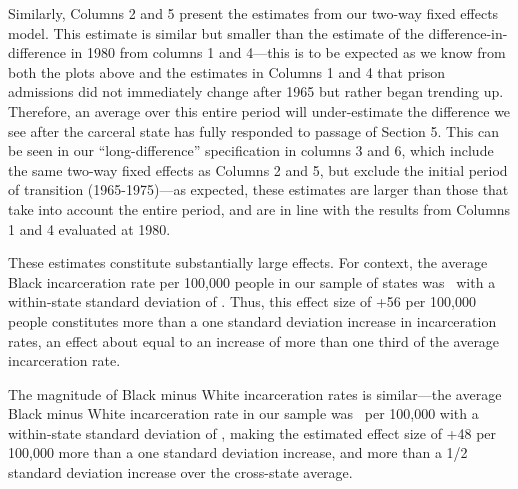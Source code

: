 \documentclass[12pt]{article}
\begin{document}
Similarly, Columns 2 and 5 present the estimates from our two-way fixed effects model. This estimate is similar but smaller than the estimate of the difference-in-difference in 1980 from columns 1 and 4---this is to be expected as we know from both the plots above and the estimates in Columns 1 and 4 that prison admissions did not immediately change after 1965 but rather began trending up.  Therefore, an average over this entire period will under-estimate the difference we see after the carceral state has fully responded to passage of Section 5.  This can be seen in our ``long-difference'' specification in columns 3 and 6, which include the same two-way fixed effects as Columns 2 and 5, but exclude the initial period of transition (1965-1975)---as expected, these estimates are larger than those that take into account the entire period, and are in line with the results from Columns 1 and 4 evaluated at 1980.

These estimates constitute substantially large effects. For context, the average Black incarceration rate per 100,000 people in our sample of states was \unskip~with a within-state standard deviation of \unskip. Thus, this effect size of +56 per 100,000 people constitutes more than a one standard deviation increase in incarceration rates, an effect about equal to an increase of more than one third of the average incarceration rate.

The magnitude of Black minus White incarceration rates is similar---the average Black minus White incarceration rate in our sample was \unskip~per 100,000 with a within-state standard deviation of \unskip, making the estimated effect size of +48 per 100,000 more than a one standard deviation increase, and more than a 1/2 standard deviation increase over the cross-state average.
\end{document}
